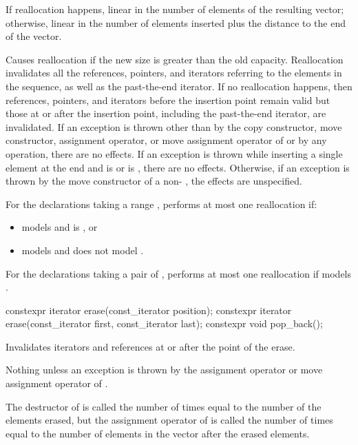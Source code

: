 \begin{itemdescr}
\pnum
\complexity
If reallocation happens,
linear in the number of elements of the resulting vector;
otherwise,
linear in the number of elements inserted plus the distance
to the end of the vector.

\pnum
\remarks
Causes reallocation if the new size is greater than the old capacity.
Reallocation invalidates all the references, pointers, and iterators
referring to the elements in the sequence, as well as the past-the-end iterator.
If no reallocation happens, then
references, pointers, and iterators
before the insertion point remain valid
but those at or after the insertion point,
including the past-the-end iterator,
are invalidated.
If an exception is thrown other than by
the copy constructor, move constructor,
assignment operator, or move assignment operator of
 or by any  operation,
there are no effects.
If an exception is thrown while inserting a single element at the end and
 is  or 
is , there are no effects.
Otherwise, if an exception is thrown by the move constructor of a non-
, the effects are unspecified.

\pnum
For the declarations taking a range ,
performs at most one reallocation if:
\begin{itemize}
\item
{} models  and
 is , or
\item
{} models  and
 does not model .
\end{itemize}
For the declarations taking a pair of ,
performs at most one reallocation if
 models .
\end{itemdescr}

%
\begin{itemdecl}
constexpr iterator erase(const_iterator position);
constexpr iterator erase(const_iterator first, const_iterator last);
constexpr void pop_back();
\end{itemdecl}

\begin{itemdescr}
\pnum
\effects
Invalidates iterators and references at or after the point of the erase.

\pnum
\throws
Nothing unless an exception is thrown by the
assignment operator or move assignment operator of
.

\pnum
\complexity
The destructor of  is called the number of times equal to the
number of the elements erased, but the assignment operator
of  is called the number of times equal to the number of
elements in the vector after the erased elements.
\end{itemdescr}

